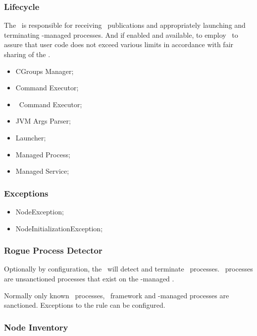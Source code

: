 \begin{itemize}
    \subsubsection{Lifecycle} 
    
    The \varAgent~is responsible for receiving \varProcessManager~publications
    and appropriately launching and terminating \varDUCC-managed processes.
    And if enabled and available, to employ \varLinuxControlGroups~to assure
    that user code does not exceed various limits in accordance with fair
    sharing of the \varNodeMachineComputer.
    
    \begin{itemize}
      \item CGroups Manager;
      \item Command Executor;
      \item \varDUCC~Command Executor;
      \item JVM Args Parser;
      \item Launcher;
      \item Managed Process;
      \item Managed Service;
    \end{itemize}
        
    \subsubsection{Exceptions} 
    
    \begin{itemize}
      \item NodeException;
      \item NodeInitializationException;
    \end{itemize}
    
    \subsubsection{Rogue Process Detector} 
    
    Optionally by configuration, the \varAgents~will detect and terminate
    \varRogue~processes.
    \varRogue~processes are unsanctioned processes that exist on the \varAgent-managed
    \varNodeMachineComputer.
    
    Normally only known \varOS~processes, \varDUCC~framework and \varDUCC-managed
    processes are sanctioned.
    Exceptions to the rule can be configured.
     
    \subsubsection{Node Inventory} 
    

\end{itemize}
